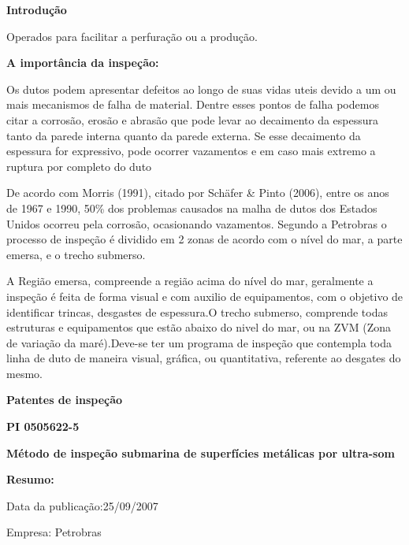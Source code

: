 \documentclass[a4paper,12pt]{article}
\begin{document}
	 
	
\hspace{-0,75cm}
\textbf{Introdução}
\vspace{1,0cm}


Operados para facilitar a perfuração ou a produção.

\vspace{1,0cm}
\hspace{-0,75cm}
\textbf{A importância da inspeção:}
\vspace{1,0cm}

Os dutos podem apresentar defeitos ao longo de suas vidas uteis devido a um ou mais
mecanismos de falha de material. Dentre esses pontos de falha podemos citar a corrosão, erosão e
abrasão que pode levar ao decaimento da espessura tanto da parede interna quanto da parede externa.
Se esse decaimento da espessura for expressivo, pode ocorrer vazamentos e em caso mais extremo a
ruptura por completo do duto

De acordo com Morris (1991), citado por Schäfer \& Pinto (2006), entre os anos de 1967 e 1990,
50\% dos problemas causados na malha de dutos dos Estados Unidos ocorreu pela corrosão, ocasionando
vazamentos.
Segundo a Petrobras o processo de inspeção é dividido em 2 zonas de acordo com o nível do mar, a parte emersa, e o trecho submerso.

A Região emersa, compreende a região acima do nível do mar, geralmente a inspeção é feita de forma visual e com auxilio de equipamentos, com o objetivo de identificar trincas, desgastes de espessura.O trecho submerso, comprende todas estruturas e equipamentos que estão abaixo do nivel do mar, ou na ZVM (Zona de variação da maré).Deve-se ter um programa de inspeção que contempla toda linha de duto de maneira visual, gráfica, ou quantitativa, referente ao desgates do mesmo.

\vspace{1,0cm}
\hspace{-0,75cm}
 \textbf{Patentes de inspeção}
 
 \vspace{1,0cm}
 \begin{center}
  \textbf{PI 0505622-5} 
 
 \textbf{Método de inspeção submarina de superfícies metálicas por ultra-som}
 \end{center}
 
 \textbf{Resumo:}
 
 Data da publicação:25/09/2007
 
 Empresa: Petrobras
 
\end{document}
